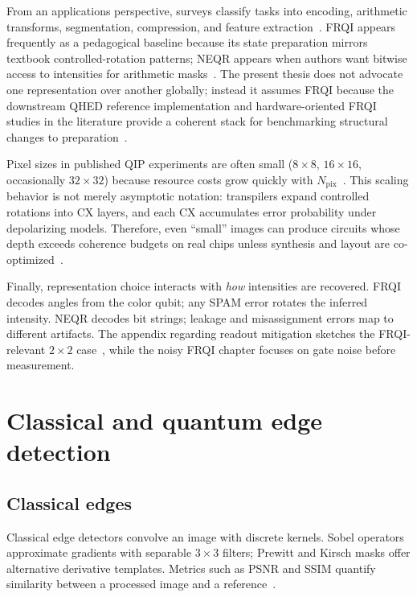 From an applications perspective, surveys classify tasks into encoding, arithmetic transforms, segmentation, compression, and feature extraction~\cite{Wang2022ReviewQIP}. FRQI appears frequently as a pedagogical baseline because its state preparation mirrors textbook controlled-rotation patterns; NEQR appears when authors want bitwise access to intensities for arithmetic masks~\cite{Zhang2013NEQR}. The present thesis does not advocate one representation over another globally; instead it assumes FRQI because the downstream QHED reference implementation and hardware-oriented FRQI studies in the literature provide a coherent stack for benchmarking structural changes to preparation~\cite{Yao2017QHED,Geng2023ImprovedFRQI}.

Pixel sizes in published QIP experiments are often small ($8\times 8$, $16\times 16$, occasionally $32\times 32$) because resource costs grow quickly with $N_{\mathrm{pix}}$~\cite{Farooq2025SystematicReview}. This scaling behavior is not merely asymptotic notation: transpilers expand controlled rotations into CX layers, and each CX accumulates error probability under depolarizing models. Therefore, even ``small'' images can produce circuits whose depth exceeds coherence budgets on real chips unless synthesis and layout are co-optimized~\cite{Geng2023ImprovedFRQI}.

Finally, representation choice interacts with \emph{how} intensities are recovered. FRQI decodes angles from the color qubit; any SPAM error rotates the inferred intensity. NEQR decodes bit strings; leakage and misassignment errors map to different artifacts. The appendix regarding readout mitigation sketches the FRQI-relevant $2\times 2$ case~\cite{Mu2025GuidedImageFiltering}, while the noisy FRQI chapter focuses on gate noise before measurement.

\section{Classical and quantum edge detection}
\subsection{Classical edges}
Classical edge detectors convolve an image with discrete kernels. Sobel operators approximate gradients with separable $3\times 3$ filters; Prewitt and Kirsch masks offer alternative derivative templates. Metrics such as PSNR and SSIM quantify similarity between a processed image and a reference~\cite{Zhang2015QSobel,Zhou2019PrewittNEQR,Xu2020Kirsch}.

